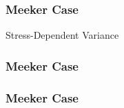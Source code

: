 \documentclass[xcolor=dvipsnames,aspectratio=1610]{beamer}
\begin{document}

\begin{frame}
\frametitle{Meeker Case}
Stress-Dependent Variance

\begin{figure}
\end{figure}

\end{frame}



\begin{frame}
\frametitle{Meeker Case}

\begin{figure}
\end{figure}

\end{frame}


\begin{frame}
\frametitle{Meeker Case}
\begin{figure}[H]
\centering
{}
\end{figure}
\end{frame}

\end{document}
